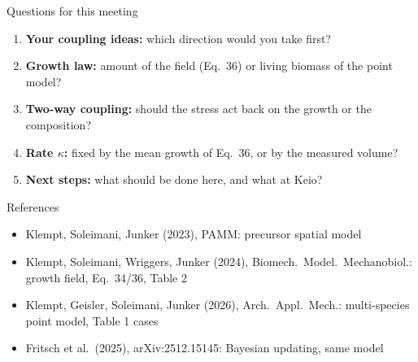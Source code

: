 \documentclass[aspectratio=169,11pt]{beamer}
\begin{document}
\begin{frame}{Questions for this meeting}
\begin{enumerate}
  \item \textbf{Your coupling ideas:} which direction would you take first?
  \item \textbf{Growth law:} amount of the field (Eq.\ 36) or living biomass of the point model?
  \item \textbf{Two-way coupling:} should the stress act back on the growth or the composition?
  \item \textbf{Rate $\kappa$:} fixed by the mean growth of Eq.\ 36, or by the measured volume?
  \item \textbf{Next steps:} what should be done here, and what at Keio?
\end{enumerate}
\end{frame}

\begin{frame}{References}
\small
\begin{itemize}
  \item Klempt, Soleimani, Junker (2023), PAMM: precursor spatial model
  \item Klempt, Soleimani, Wriggers, Junker (2024), Biomech.\ Model.\ Mechanobiol.:
        growth field, Eq.\ 34/36, Table 2
  \item Klempt, Geisler, Soleimani, Junker (2026), Arch.\ Appl.\ Mech.:
        multi-species point model, Table 1 cases
  \item Fritsch et al.\ (2025), arXiv:2512.15145: Bayesian updating, same model
\end{itemize}
\end{frame}
\end{document}
